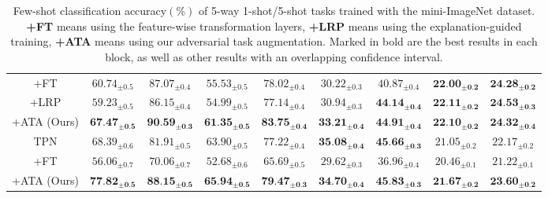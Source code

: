 \documentclass{article}
\begin{document}
\begin{table*}[ht]
{\begin{tabular}{ccccccccc}
+FT \cite{DBLP:conf/iclr/TsengLH020} & $60.74_{\pm0.5}$ & $87.07_{\pm0.4}$ & $55.53_{\pm0.5}$ & $78.02_{\pm0.4}$ & $30.22_{\pm0.3}$ & $40.87_{\pm0.4}$ & $\textbf{22.00}_{\pm\textbf{0.2}}$ & $\textbf{24.28}_{\pm\textbf{0.2}}$ \\
+LRP \cite{sun2020explanation} & $59.23_{\pm0.5}$ & $86.15_{\pm0.4}$ & $54.99_{\pm0.5}$ & $77.14_{\pm0.4}$ & $30.94_{\pm0.3}$ & $\textbf{44.14}_{\pm\textbf{0.4}}$ & $\textbf{22.11}_{\pm\textbf{0.2}}$ & $\textbf{24.53}_{\pm\textbf{0.3}}$ \\
+ATA (Ours) & $\textbf{67.47}_{\pm\textbf{0.5}}$ & $\textbf{90.59}_{\pm\textbf{0.3}}$ & $\textbf{61.35}_{\pm\textbf{0.5}}$ & $\textbf{83.75}_{\pm\textbf{0.4}}$ & $\textbf{33.21}_{\pm\textbf{0.4}}$ & $\textbf{44.91}_{\pm\textbf{0.4}}$ & $\textbf{22.10}_{\pm\textbf{0.2}}$ & $\textbf{24.32}_{\pm\textbf{0.4}}$ \\
\hline
TPN             & $68.39_{\pm0.6}$ & $81.91_{\pm0.5}$ & $63.90_{\pm0.5}$ & $77.22_{\pm0.4}$ & $\textbf{35.08}_{\pm\textbf{0.4}}$ & $\textbf{45.66}_{\pm\textbf{0.3}}$ & $21.05_{\pm0.2}$ & $22.17_{\pm0.2}$ \\
+FT \cite{DBLP:conf/iclr/TsengLH020} & $56.06_{\pm0.7}$ & $70.06_{\pm0.7}$ & $52.68_{\pm0.6}$ & $65.69_{\pm0.5}$ & $29.62_{\pm0.3}$ & $36.96_{\pm0.4}$ & $20.46_{\pm0.1}$ & $21.22_{\pm0.1}$ \\
+ATA (Ours) & $\textbf{77.82}_{\pm\textbf{0.5}}$ & $\textbf{88.15}_{\pm\textbf{0.5}}$ & $\textbf{65.94}_{\pm\textbf{0.5}}$ & $\textbf{79.47}_{\pm\textbf{0.3}}$ & $\textbf{34.70}_{\pm\textbf{0.4}}$ & $\textbf{45.83}_{\pm\textbf{0.3}}$ & $\textbf{21.67}_{\pm\textbf{0.2}}$ & $\textbf{23.60}_{\pm\textbf{0.2}}$ \\
\bottomrule
\end{tabular}}
\caption{Few-shot classification accuracy$(\%)$ of 5-way 1-shot/5-shot tasks trained with the mini-ImageNet dataset. \textbf{+FT} means using the feature-wise transformation layers, \textbf{+LRP} means using the explanation-guided training, \textbf{+ATA} means using our adversarial task augmentation. Marked in bold are the best results in each block, as well as other results with an overlapping confidence interval.}
\label{SOTA}
\end{table*}
\end{document}
